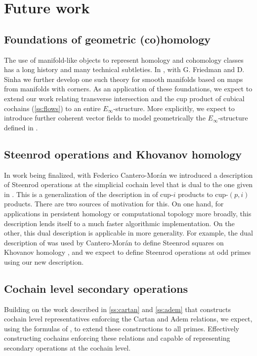 
\section{Future work}

\subsection{Foundations of geometric (co)homology} \label{ss:foundations}

The use of manifold-like objects to represent homology and cohomology classes has a long history and many technical subtleties.
In \cite{medina2021foundations}, with G. Friedman and D. Sinha we further develop one such theory for smooth manifolds based on maps from manifolds with corners.
As an application of these foundations, we expect to extend our work relating transverse intersection and the cup product of cubical cochains (\cref{ss:flows}) to an entire $E_\infty$-structure.
More explicitly, we expect to introduce further coherent vector fields to model geometrically the $E_\infty$-structure defined in \cite{medina2021cubical}.

\subsection{Steenrod operations and Khovanov homology}

In work being finalized, with Federico Cantero-Mor\'{a}n we introduced a description of Steenrod operations at the simplicial cochain level that is dual to the one given in \cite{medina2020maysteenrod}.
This is a generalization of the description in \cite{medina2021newformulas} of cup-$i$ products to cup-$(p,i)$ products.
There are two sources of motivation for this.
On one hand, for applications in persistent homology or computational topology more broadly, this description lends itself to a much faster algorithmic implementation.
On the other, this dual description is applicable in more generality.
For example, the dual description of \cite{medina2021newformulas} was used by Cantero-Mor\'{a}n to define Steenrod squares on Khovanov homology \cite{cantero-moran2020khovanov}, and we expect to define Steenrod operations at odd primes using our new description.

\subsection{Cochain level secondary operations}

Building on the work described in \cref{ss:cartan} and \cref{ss:adem} that constructs cochain level representatives enforcing the Cartan and Adem relations, we expect, using the formulas of \cite{medina2020maysteenrod}, to extend these constructions to all primes.
Effectively constructing cochains enforcing these relations and capable of representing secondary operations at the cochain level.

